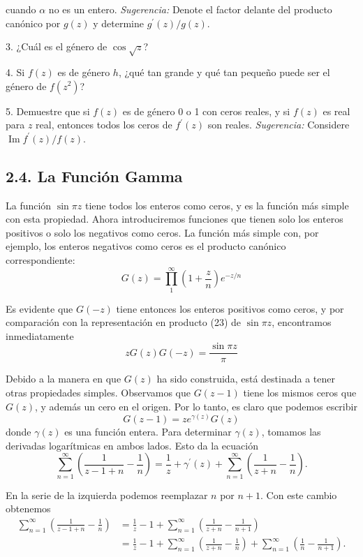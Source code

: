 \documentclass{article}
\theoremstyle{nonumberplain}
\begin{document}
\begin{theorem}[7]
cuando \( \alpha \) no es un entero. \emph{Sugerencia:} Denote el factor delante del producto canónico por \( g(z) \) y determine \( g^{\prime}(z) / g(z) \).

3. ¿Cuál es el género de \( \cos \sqrt{z} \)?

4. Si \( f(z) \) es de género \( h \), ¿qué tan grande y qué tan pequeño puede ser el género de \( f\left(z^{2}\right) \)?

5. Demuestre que si \( f(z) \) es de género 0 o 1 con ceros reales, y si \( f(z) \) es real para \( z \) real, entonces todos los ceros de \( f^{\prime}(z) \) son reales. \emph{Sugerencia:} Considere \( \operatorname{Im} f^{\prime}(z) / f(z) \).

\subsection*{2.4. La Función Gamma} La función \( \sin \pi z \) tiene todos los enteros como ceros, y es la función más simple con esta propiedad. Ahora introduciremos funciones que tienen solo los enteros positivos o solo los negativos como ceros. La función más simple con, por ejemplo, los enteros negativos como ceros es el producto canónico correspondiente:
\[
G(z)=\prod_{1}^{\infty}\left(1+\frac{z}{n}\right) e^{-z / n}
\]

Es evidente que \( G(-z) \) tiene entonces los enteros positivos como ceros, y por comparación con la representación en producto (23) de \( \sin \pi z \), encontramos inmediatamente
\[
z G(z) G(-z)=\frac{\sin \pi z}{\pi}
\]

Debido a la manera en que \( G(z) \) ha sido construida, está destinada a tener otras propiedades simples. Observamos que \( G(z-1) \) tiene los mismos ceros que \( G(z) \), y además un cero en el origen. Por lo tanto, es claro que podemos escribir
\[
G(z-1)=z e^{\gamma(z)} G(z)
\]
donde \( \gamma(z) \) es una función entera. Para determinar \( \gamma(z) \), tomamos las derivadas logarítmicas en ambos lados. Esto da la ecuación
\[
\sum_{n=1}^{\infty}\left(\frac{1}{z-1+n}-\frac{1}{n}\right)=\frac{1}{z}+\gamma^{\prime}(z)+\sum_{n=1}^{\infty}\left(\frac{1}{z+n}-\frac{1}{n}\right) .
\]

En la serie de la izquierda podemos reemplazar \( n \) por \( n+1 \). Con este cambio obtenemos
\[
\begin{aligned}
\sum_{n=1}^{\infty}\left(\frac{1}{z-1+n}-\frac{1}{n}\right) & =\frac{1}{z}-1+\sum_{n=1}^{\infty}\left(\frac{1}{z+n}-\frac{1}{n+1}\right) \\
& =\frac{1}{z}-1+\sum_{n=1}^{\infty}\left(\frac{1}{z+n}-\frac{1}{n}\right)+\sum_{n=1}^{\infty}\left(\frac{1}{n}-\frac{1}{n+1}\right) .
\end{aligned}
\]


\end{theorem}
\end{document}
